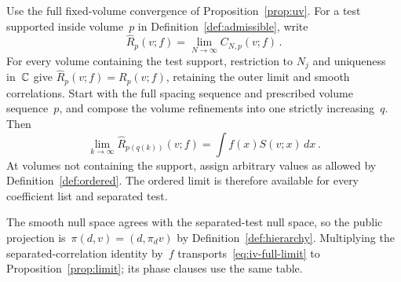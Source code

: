 Use the full fixed-volume convergence of Proposition~\ref{prop:uv}.
For a test supported inside volume~$p$ in Definition~\ref{def:admissible}, write
\begin{equation*}
\widehat R_p(v;f)=\lim_{N\to\infty}C_{N,p}(v;f)\,.
\end{equation*}
For every volume containing the test support, restriction to $N_j$ and uniqueness in~$\mathbb C$ give
\(\widehat R_p(v;f)=R_p(v;f)\), retaining the outer limit and smooth correlations.
Start with the full spacing sequence and prescribed volume sequence~$p$, and compose the volume refinements into one strictly increasing~$q$.
Then
\begin{equation}\label{eq:iv-full-limit}
\lim_{k\to\infty}\widehat R_{p(q(k))}(v;f)
=\int f(x)S(v;x)\,dx\,.
\end{equation}
At volumes not containing the support, assign arbitrary values as allowed by Definition~\ref{def:ordered}. The ordered limit is therefore available for every coefficient list and separated test.


The smooth null space agrees with the separated-test null space, so the public projection is~$\pi(d,v)=(d,\pi_dv)$ by Definition~\ref{def:hierarchy}. Multiplying the separated-correlation identity by~$f$ transports~\eqref{eq:iv-full-limit} to Proposition~\ref{prop:limit}; its phase clauses use the same table.
